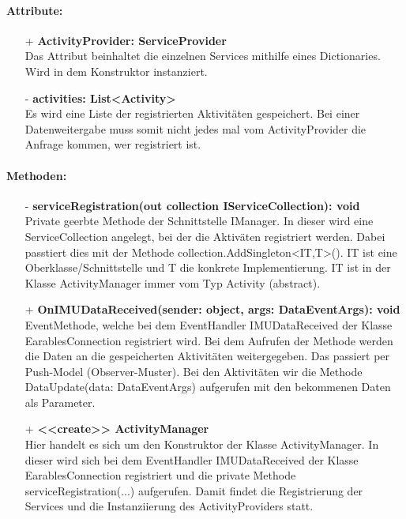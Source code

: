 \documentclass[a4paper,12pt]{article}
\begin{document}
	\paragraph{Attribute:}
	\begin{itemize}
		\item[+] \textbf{ActivityProvider: ServiceProvider}\\Das Attribut beinhaltet die einzelnen Services mithilfe eines Dictionaries. Wird in dem Konstruktor instanziert.
		\item[-] \textbf{activities: List<Activity>}\\Es wird eine Liste der registrierten Aktivitäten gespeichert. Bei einer Datenweitergabe muss somit nicht jedes mal vom ActivityProvider die Anfrage kommen, wer registriert ist. 
	\end{itemize}
	\paragraph{Methoden:}
	\begin{itemize}
		\item[-] \textbf{serviceRegistration(out collection IServiceCollection): void}\\Private geerbte Methode der Schnittstelle IManager. In dieser wird eine ServiceCollection angelegt, bei der die Aktiväten registriert werden. Dabei passtiert dies mit der Methode collection.AddSingleton<IT,T>(). IT ist eine Oberklasse/Schnittstelle und T die konkrete Implementierung. IT ist in der Klasse ActivityManager immer vom Typ Activity (abstract).
		\item[+] \textbf{OnIMUDataReceived(sender: object, args: DataEventArgs): void}\\EventMethode, welche bei dem EventHandler IMUDataReceived der Klasse EarablesConnection registriert wird. Bei dem Aufrufen der Methode werden die Daten an die gespeicherten Aktivitäten weitergegeben. Das passiert per Push-Model (Observer-Muster). Bei den Aktivitäten wir die Methode DataUpdate(data: DataEventArgs) aufgerufen mit den bekommenen Daten als Parameter.
		\item[+] \textbf{<<create>> ActivityManager}\\Hier handelt es sich um den Konstruktor der Klasse ActivityManager. In dieser wird sich bei dem EventHandler IMUDataReceived der Klasse EarablesConnection registriert und die private Methode serviceRegistration(...) aufgerufen. Damit findet die Registrierung der Services und die Instanziierung des ActivityProviders statt.
	\end{itemize}
	
\end{document}
